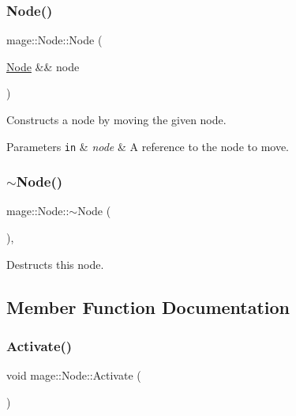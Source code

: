 \subsubsection{\texorpdfstring{Node()}{Node()}\hspace{0.1cm}{\footnotesize\ttfamily [3/3]}}
{\footnotesize\ttfamily mage\+::\+Node\+::\+Node (\begin{DoxyParamCaption}\item[{\hyperlink{classmage_1_1_node}{Node} \&\&}]{node }\end{DoxyParamCaption})\hspace{0.3cm}{\ttfamily [default]}}

Constructs a node by moving the given node.


\begin{DoxyParams}[1]{Parameters}
\mbox{\tt in}  & {\em node} & A reference to the node to move. \\
\hline
\end{DoxyParams}
\hypertarget{classmage_1_1_node_a1369fc11b331abacbaf11aeb5729e871}{}\label{classmage_1_1_node_a1369fc11b331abacbaf11aeb5729e871} 
\subsubsection{\texorpdfstring{$\sim$\+Node()}{~Node()}}
{\footnotesize\ttfamily mage\+::\+Node\+::$\sim$\+Node (\begin{DoxyParamCaption}{ }\end{DoxyParamCaption})\hspace{0.3cm}{\ttfamily [virtual]}, {\ttfamily [default]}}

Destructs this node. 

\subsection{Member Function Documentation}
\hypertarget{classmage_1_1_node_aefa62a09afd2b0d314a64e6d45f45a34}{}\label{classmage_1_1_node_aefa62a09afd2b0d314a64e6d45f45a34} 
\subsubsection{\texorpdfstring{Activate()}{Activate()}}
{\footnotesize\ttfamily void mage\+::\+Node\+::\+Activate (\begin{DoxyParamCaption}{ }\end{DoxyParamCaption})\hspace{0.3cm}{\ttfamily [noexcept]}}

